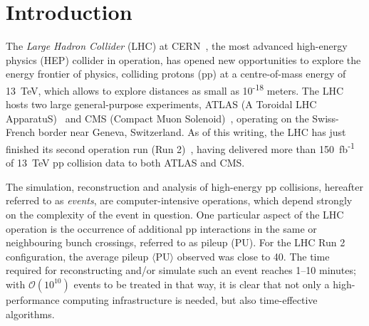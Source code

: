 \documentclass[12pt,a4paper]{sprace}
\begin{document}


\tableofcontents
\clearpage

\section{Introduction}


The \emph{Large Hadron Collider} (LHC) at CERN~\cite{evans:2008zzb}, the most advanced high-energy physics (HEP) collider in operation, has opened new opportunities to explore the energy frontier of physics, colliding protons (pp) at a centre-of-mass energy of 13~TeV, which allows to explore distances as small as 10\textsuperscript{-18} meters. The LHC hosts two large general-purpose experiments, ATLAS (A Toroidal LHC ApparatuS)~\cite{Aad:2008zzm} and CMS (Compact Muon Solenoid)~\cite{chatrchyan:2008zzk}, operating on the Swiss-French border near Geneva, Switzerland. As of this writing, the LHC has just finished its second operation run (Run 2)~\cite{LHCEndRun2}, having delivered more than 150~fb\textsuperscript{-1} of 13~TeV pp collision data to both ATLAS and CMS.

The simulation, reconstruction and analysis of high-energy pp collisions, hereafter referred to as \emph{events}, are computer-intensive operations, which depend strongly on the complexity of the event in question. One particular aspect of the LHC operation is the occurrence of additional pp interactions in the same or neighbouring bunch crossings, referred to as pileup (PU). For the LHC Run 2 configuration, the average pileup $\langle \text{PU} \rangle$ observed was close to 40. The time required for reconstructing and/or simulate such an event reaches 1--10 minutes; with $\mathcal{O}(10^{10})$ events to be treated in that way, it is clear that not only a high-performance computing infrastructure is needed, but also time-effective algorithms.
\end{document}
